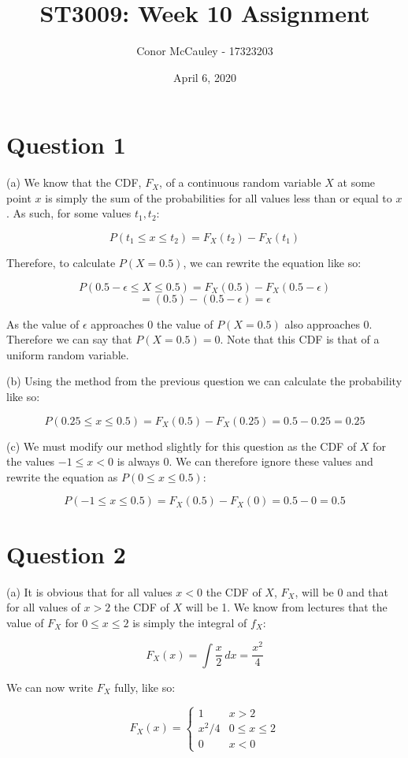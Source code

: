 \documentclass[12pt]{article}
\title{ST3009: Week 10 Assignment}
\author{Conor McCauley - 17323203}
\date{April 6, 2020}
\begin{document}
\maketitle

\section*{Question 1}

\noindent (a) We know that the CDF, $F_X$, of a continuous random variable $X$ at some point $x$ is simply the sum of the probabilities for all values less than or equal to $x$. As such, for some values $t_1, t_2$:

$$P(t_1 \le x \le t_2) = F_X(t_2) - F_X(t_1)$$

\indent Therefore, to calculate $P(X = 0.5)$, we can rewrite the equation like so:

$$P(0.5 - \epsilon \le X \le 0.5) = F_X(0.5) - F_X(0.5 - \epsilon)$$
$$= (0.5) - (0.5 - \epsilon) = \epsilon$$

\indent As the value of $\epsilon$ approaches 0 the value of $P(X = 0.5)$ also approaches 0. Therefore we can say that $P(X = 0.5) = 0$. Note that this CDF is that of a uniform random variable.

\noindent (b) Using the method from the previous question we can calculate the probability like so:

$$P(0.25 \le x \le 0.5) = F_X(0.5) - F_X(0.25) = 0.5 - 0.25 = 0.25$$

\noindent (c) We must modify our method slightly for this question as the CDF of $X$ for the values $-1 \le x < 0$ is always 0. We can therefore ignore these values and rewrite the equation as $P(0 \le x \le 0.5)$:

$$P(-1 \le x \le 0.5) = F_X(0.5) - F_X(0) = 0.5 - 0 = 0.5$$

\section*{Question 2}

\noindent (a) It is obvious that for all values $x < 0$ the CDF of $X$, $F_X$, will be 0 and that for all values of $x > 2$ the CDF of $X$ will be 1. We know from lectures that the value of $F_X$ for $0 \le x \le 2$ is simply the integral of $f_X$:

$$F_X(x) = \int \frac{x}{2}\,dx = \frac{x^2}{4}$$

\indent We can now write $F_X$ fully, like so:

$$
F_X(x) =
\begin{cases}
    1 & x > 2 \\
    x^{2}/4 & 0 \le x \le 2 \\
    0 & x < 0
\end{cases}
$$
\end{document}
